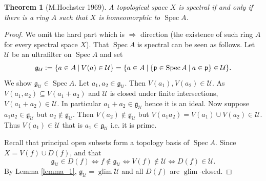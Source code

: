 \documentclass[8pt]{article}
\numberwithin{equation}{section}
\newtheorem{theorem}{Theorem} [subsection]
\newtheorem{remark}{Remark}[subsection]
\DeclareMathOperator{\Spec}{Spec}
\DeclareMathOperator{\glim}{glim}
\newcommand{\defeq}{\vcentcolon=}
\newcommand{\U}[0]{\mathcal{U}}
\newcommand{\B}[0]{\mathcal{B}}
\newcommand{\sep}[0]{\:|\:}
\newcommand{\g}[0]{\mathfrak{g}}
\newcommand{\p}[0]{\mathfrak{p}}
\begin{document}
\begin{theorem}[M.Hochster 1969]
    \label{theorem_1}
    A topological space $X$ is spectral if and only if there is a ring $A$ such that $X$ is homeomorphic to $\Spec A$.
\end{theorem}

\begin{proof}
We omit the hard part which is $\Rightarrow$ direction (the existence of such ring $A$ for every spectral space $X$). That $\Spec A$ is spectral can be seen as follows. Let $\U$ be an ultrafilter on $\Spec A$ and set
\begin{equation*}
    \mathfrak{g}_\U \defeq \{a\in A\sep V(a)\in\U\} = \{a\in A\sep \{\mathfrak{p}\in\Spec A\sep a\in\mathfrak{p}\}\in\U\}.
\end{equation*}
 We show $\mathfrak{g}_\U\in\Spec A$. Let $a_1,a_2\in\mathfrak{g}_\U$. Then $V(a_1),V(a_2)\in\U$. As $V(a_1,a_2)\subseteq V(a_1+a_2)$ and $\U$ is closed under finite intersections, $V(a_1+a_2)\in\U$. In particular $a_1+a_2\in\g_\U$ hence it is an ideal. Now suppose $a_1a_2\in\g_\U$ but $a_2\not\in\g_\U$. Then $V(a_2)\not\in\g_\U$ but $V(a_1a_2) = V(a_1)\cup V(a_2)\in\U$. Thus $V(a_1)\in\U$ that is $a_1\in\g_\U$ i.e. it is prime.%
\par Recall that principal open subsets form a topology basis of $\Spec A$. Since $X=V(f)\cup D(f)$, and that 
\begin{equation*}
\g_\U\in D(f) \Leftrightarrow f\not\in\g_\U \Leftrightarrow V(f)\not\in \U \Leftrightarrow D(f)\in\U.
\end{equation*}
By Lemma \ref{lemma_1}, $\mathfrak{g}_\U=\glim\U$ and all $D(f)$ are $\glim$-closed.
\end{proof}
\end{document}
